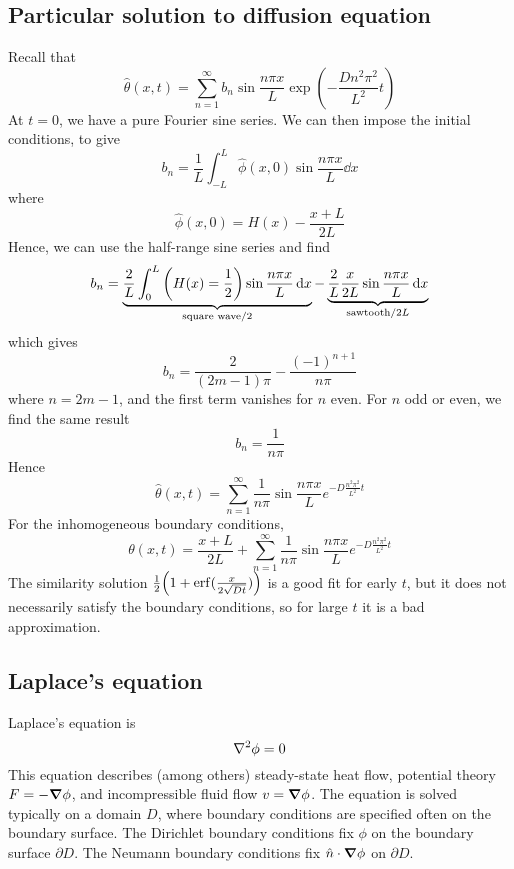 \subsection{Particular solution to diffusion equation}
Recall that
\[
	\hat \theta(x,t) = \sum_{n=1}^\infty b_n \sin \frac{n \pi x}{L} \exp(-\frac{Dn^2 \pi^2}{L^2} t )
\]
At \( t = 0 \), we have a pure Fourier sine series.
We can then impose the initial conditions, to give
\[ b_n = \frac{1}{L} \int_{-L}^L \hat \phi(x,0) \sin \frac{n \pi x}{L} \dd{x} \]
where
\[ \hat\phi(x,0) = H(x) - \frac{x+L}{2L} \]
Hence, we can use the half-range sine series and find
\[ b_n = \underbrace{ \frac{2}{L} \int_0^L \qty(H(x) = \frac{1}{2}) \sin \frac{n \pi x}{L} \dd{x} }_{\text{square wave}/2} - \underbrace{ \frac{2}{L}\frac{x}{2L} \sin \frac{n \pi x}{L} \dd{x} }_{\text{sawtooth}/2L} \]
which gives
\[ b_n = \frac{2}{(2m-1)\pi} - \frac{(-1)^{n+1}}{n\pi} \]
where \( n = 2m - 1 \), and the first term vanishes for \( n \) even.
For \( n \) odd or even, we find the same result
\[ b_n = \frac{1}{n\pi} \]
Hence
\[ \hat\theta(x,t) = \sum_{n=1}^\infty \frac{1}{n \pi} \sin \frac{n \pi x}{L} e^{-D \frac{n^2 \pi^2}{L^2} t} \]
For the inhomogeneous boundary conditions,
\[ \theta(x,t) = \frac{x+L}{2L} + \sum_{n=1}^\infty \frac{1}{n \pi} \sin \frac{n \pi x}{L} e^{-D \frac{n^2 \pi^2}{L^2} t} \]
The similarity solution \( \frac{1}{2}\qty(1 + \erf(\frac{x}{2\sqrt{Dt}})) \) is a good fit for early \( t \), but it does not necessarily satisfy the boundary conditions, so for large \( t \) it is a bad approximation.

\subsection{Laplace's equation}
Laplace's equation is
\[ \laplacian \phi = 0 \]
This equation describes (among others) steady-state heat flow, potential theory \( F = -\grad{\phi} \), and incompressible fluid flow \( v = \grad{\phi} \).
The equation is solved typically on a domain \( D \), where boundary conditions are specified often on the boundary surface.
The Dirichlet boundary conditions fix \( \phi \) on the boundary surface \( \partial D \).
The Neumann boundary conditions fix \( \hat n \cdot \grad{\phi} \) on \( \partial D \).

